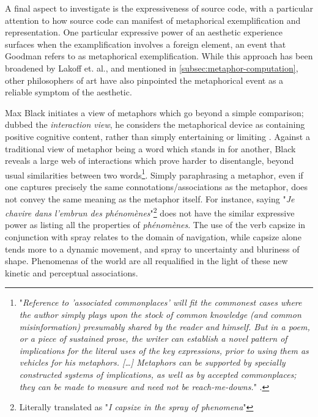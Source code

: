 A final aspect to investigate is the expressiveness of source code, with a particular attention to how source code can manifest of metaphorical exemplification and representation. One particular expressive power of an aesthetic experience surfaces when the examplification involves a foreign element, an event that Goodman refers to as metaphorical exemplification. While this approach has been broadened by Lakoff et. al., and mentioned in \autoref{subsec:metaphor-computation}, other philosophers of art have also pinpointed the metaphorical event as a reliable symptom of the aesthetic.

Max Black initiates a view of metaphors which go beyond a simple comparison; dubbed the \emph{interaction view}, he considers the metaphorical device as containing positive cognitive content, rather than simply entertaining or limiting \citep{black_metaphor_1955}. Against a traditional view of metaphor being a word which stands in for another, Black reveals a large web of interactions which prove harder to disentangle, beyond usual similarities between two words\footnote{"\emph{Reference to 'associated commonplaces' will fit the commonest cases where the author simply plays upon the stock of common knowledge (and common misinformation) presumably shared by the reader and himself. But in a poem, or a piece of sustained prose, the writer can establish a novel pattern of implications for the literal uses of the key expressions, prior to using them as vehicles for his metaphors. [\dots] Metaphors can be supported by specially constructed systems of implications, as well as by accepted commonplaces; they can be made to measure and need not be reach-me-downs.}" \citep{black_metaphor_1955}.}. Simply paraphrasing a metaphor, even if one captures precisely the same connotations/associations as the metaphor, does not convey the same meaning as the metaphor itself. For instance, saying "\emph{Je chavire dans l'embrun des phénomènes}"\footnote{Literally translated as "\emph{I capsize in the spray of phenomena}"} \citep{beckett_molloy_1982} does not have the similar expressive power as listing all the properties of \emph{phénomènes}. The use of the verb capsize in conjunction with spray relates to the domain of navigation, while capsize alone tends more to a dynamic movement, and spray to uncertainty and bluriness of shape. Phenomenas of the world are all requalified in the light of these new kinetic and perceptual associations.

